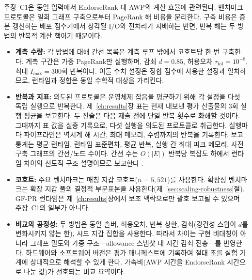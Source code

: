 
주장~C1은 동일 입력에서 EndorseRank 대 AWP의 계산 효율에 관련된다. 벤치마크 프로토콜은 일회 그래프 구축으로부터 PageRank 해 비용을 분리한다. 구축 비용은 증분 갱신하는 배포 점수기에서 상각될 I/O와 전처리가 지배하는 반면, 반복 해는 두 방법의 반복적 계산 핵이기 때문이다.

\begin{itemize}
\item \textbf{계측 수량:} 각 방법에 대해 간선 목록은 계측 루프 밖에서 코호트당 한 번 구축한다. 계측 구간은 가중 PageRank만 실행하며, 감쇠 $d=0.85$, 허용오차 $\tau_{\mathrm{tol}}=10^{-8}$, 최대 $I_{\max}=300$회 반복이다. 이들 수치 설정은 정합 점수에 사용한 설정과 일치하므로, 런타임과 정합은 동일 수학적 대상을 가리킨다.

\item \textbf{반복과 지표:} 의도된 프로토콜은 운영체제 잡음을 평균하기 위해 각 설정을 다섯 독립 실행으로 반복한다. 제~\ref{ch:results}장 표는 현재 내보낸 평가 산출물의 3회 실행 평균을 보고한다. 두 진술은 다음 제출 전에 단일 반복 횟수로 화해할 것이다. 그때까지 표 값을 실증 기록으로, 다섯 실행을 의도된 프로토콜로 취급한다. 실행마다 파이프라인은 벽시계 해 시간, 최대 메모리, 수렴까지의 반복을 기록한다. 보고 통계는 평균 런타임, 런타임 표준편차, 평균 반복, 실행 간 최대 피크 메모리, 사전 구축 그래프의 간선/노드 수이다. 간선 수는 $O(|E|)$ 반복당 복잡도 하에서 런타임 차이의 선도적 구조 설명이므로 보고한다 .

\item \textbf{코호트:} 주요 벤치마크는 매칭 지갑 코호트($n=5{,}521$)를 사용한다. 확장성 벤치마크는 확장 지갑 풀의 결정적 부분표본을 사용한다(제~\ref{sec:scaling-robustness}절). GF-PR 런타임은 제~\ref{ch:results}장에서 보조 맥락으로만 괄호 보고될 수 있으며 주장~C1의 일부가 아니다.

\item \textbf{비교의 공정성:} 두 방법은 동일 솔버, 허용오차, 반복 상한, 감쇠(강건성 스윕이 $d$를 변화시키지 않는 한), 시드 지갑 집합을 사용한다. 따라서 차이는 구현 비대칭이 아니라 그래프 밀도와 가중 구조---allowance 스냅샷 대 시간 감쇠 전송---를 반영한다. 하드웨어와 소프트웨어 버전은 평가 매니페스트에 기록하여 절대 초를 실험 기계에 상대적으로 해석할 수 있게 한다. 가속비(AWP 시간을 EndorseRank 시간으로 나눈 값)가 선호되는 비교 요약이다.

\end{itemize}


